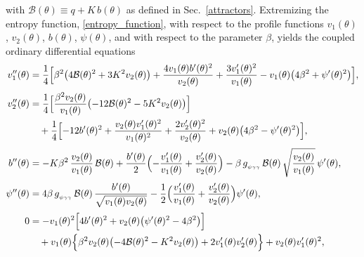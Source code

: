 \documentclass[11pt]{article}
\numberwithin{equation}{section} %
\begin{document}
{with $\mathcal{B}(\theta) \equiv q + K\,b(\theta)$ as defined  in Sec.~\ref{attractors}. Extremizing}  the entropy function{, \eqref{entropy_function},}  with respect to the profile functions 
\(v_1(\theta)\), \(v_2(\theta)\), \(b(\theta)\), \(\psi(\theta)\), and with
respect to the parameter \(\beta\), yields the coupled ordinary differential
equations
\begin{subequations}
\label{eq:A2}
\setlength{\jot}{3pt}
\begin{align}
v_1''(\theta)
&= \frac{1}{4}\Bigl[
      \beta^{2}\bigl(4   \mathcal{B} (\theta)^{2} + 3 K^{2} v_{2}(\theta)\bigr)
      + \frac{4 v_{1}(\theta) b'(\theta)^{2}}{v_{2}(\theta)}
      + \frac{3 v_{1}'(\theta)^{2}}{v_{1}(\theta)}
      - v_{1}(\theta)\bigl(4\beta^{2} + \psi'(\theta)^{2}\bigr)
    \Bigr], \label{eq:NH-v1}\\[2pt]
%
v_2''(\theta)
&= \frac{1}{4}\Bigl[
      \frac{\beta^{2} v_{2}(\theta)}{v_{1}(\theta)}
        \bigl(-12   \mathcal{B} (\theta)^{2} - 5 K^{2} v_{2}(\theta)\bigr)
    \Bigr] \notag\\
&\quad
   + \frac{1}{4}\Bigl[
      - 12 b'(\theta)^{2}
      + \frac{v_{2}(\theta) v_{1}'(\theta)^{2}}{v_{1}(\theta)^{2}}
      + \frac{2 v_{2}'(\theta)^{2}}{v_{2}(\theta)}
      + v_{2}(\theta)\bigl(4\beta^{2} - \psi'(\theta)^{2}\bigr)
    \Bigr], \label{eq:NH-v2} \\[2pt]
%
b''(\theta)
&= - K \beta^{2}\,\frac{v_{2}(\theta)}{v_{1}(\theta)}\,   \mathcal{B} (\theta)
   + \frac{b'(\theta)}{2}
     \Bigl(
        -\frac{v_{1}'(\theta)}{v_{1}(\theta)}
        + \frac{v_{2}'(\theta)}{v_{2}(\theta)}
     \Bigr)   - \beta\, g_{_{\psi\gamma\gamma}}\,   \mathcal{B} (\theta)\,
     \sqrt{\frac{v_{2}(\theta)}{v_{1}(\theta)}}\,\psi'(\theta), \\[2pt]
%
\psi''(\theta)
&= 4\beta\, g_{_{\psi\gamma\gamma}}\,   \mathcal{B} (\theta)\,
     \frac{b'(\theta)}{\sqrt{v_{1}(\theta)v_{2}(\theta)}}    - \frac{1}{2}
     \Bigl(
        \frac{v_{1}'(\theta)}{v_{1}(\theta)}
        + \frac{v_{2}'(\theta)}{v_{2}(\theta)}
     \Bigr)\psi'(\theta),\\[2pt]
%
0
&= - v_{1}(\theta)^{2}\Bigl[
        4 b'(\theta)^{2}
        + v_{2}(\theta)\bigl(\psi'(\theta)^{2} - 4\beta^{2}\bigr)
    \Bigr] \notag\\
&\quad
   + v_{1}(\theta)\Bigl\{
       \beta^{2} v_{2}(\theta)\bigl(-4   \mathcal{B} (\theta)^{2} - K^{2} v_{2}(\theta)\bigr)
       + 2 v_{1}'(\theta) v_{2}'(\theta)
     \Bigr\}
   + v_{2}(\theta) v_{1}'(\theta)^{2}\label{eq:NH-constraint},
\end{align}
\end{subequations}
\end{document}
